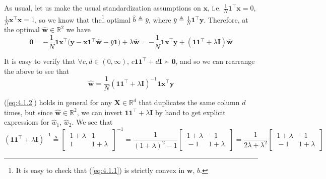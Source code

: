 \documentclass{article}
\numberwithin{equation}{section}
\begin{document}
As usual, let us make the usual standardization assumptions on $ \mathbf{x} $,
i.e. $ \frac{1}{N}\mathbf{1}^\top\mathbf{x} = 0 $,
$ \frac{1}{N}\mathbf{x}^\top\mathbf{x} = 1 $, so we know that the\footnote{
    It is easy to check that (\ref{eq:4.1.1}) is strictly convex in
    $ \mathbf{w} $, $ b $.
} optimal $ \hat{b} \triangleq \bar{y} $, where
$ \bar{y} \triangleq \frac{1}{N}\mathbf{1}^\top\mathbf{y} $. Therefore, at
the optimal $ \hat{\mathbf{w}} \in \mathbb{R}^2 $ we have
\begin{equation*}
    \mathbf{0} =
    -\frac{1}{N}\mathbf{1x}^\top\big(
        \mathbf{y} -  \mathbf{x1}^\top\hat{\mathbf{w}} - \bar{y}\mathbf{1}
    \big) +
    \lambda\hat{\mathbf{w}} =
    -\frac{1}{N}\mathbf{1x}^\top\mathbf{y} +
    \left(\mathbf{11}^\top + \lambda\mathbf{I}\right)\hat{\mathbf{w}}
\end{equation*}

It is easy to verify that $ \forall c, d \in (0, \infty) $,
$ c\mathbf{11}^\top + d\mathbf{I} \succ \mathbf{0} $, and so we can rearrange
the above to see that
\begin{equation} \label{eq:4.1.2}
    \hat{\mathbf{w}} =
    \frac{1}{N}\left(
        \mathbf{11}^\top + \lambda\mathbf{I}
    \right)^{-1}
    \mathbf{1x}^\top\mathbf{y}
\end{equation}

(\ref{eq:4.1.2}) holds in general for any $ \mathbf{X} \in \mathbb{R}^d $ that
duplicates the same column $ d $ times, but since
$ \hat{\mathbf{w}} \in \mathbb{R}^2 $, we can invert
$ \mathbf{11}^\top + \lambda\mathbf{I} $ by hand to get explicit expressions
for $ \hat{w}_1 $, $ \hat{w}_2 $. We see that
\begin{equation} \label{eq:4.1.3}
    \left(\mathbf{11}^\top + \lambda\mathbf{I}\right)^{-1} \triangleq
    \begin{bmatrix}
        \ 1 + \lambda & 1 \ \\ \ 1 & 1 + \lambda \
    \end{bmatrix}^{-1} =
    \frac{1}{(1 + \lambda)^2 - 1}
    \begin{bmatrix}
        \ 1 + \lambda & -1 \ \\ \ -1 & 1 + \lambda \
    \end{bmatrix} =
    \frac{1}{2\lambda + \lambda^2}
    \begin{bmatrix}
        \ 1 + \lambda & -1 \ \\ \ -1 & 1 + \lambda \
    \end{bmatrix}
\end{equation}
\end{document}
